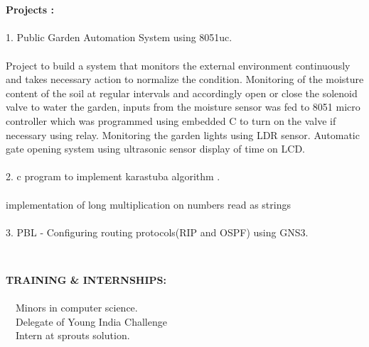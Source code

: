 \documentclass[1pt]{article}
\begin{document}
\begin{flushleft}
\begin{flushleft}
			\hspace{1cm}\\
			\hspace{1cm}\\
			
			\hspace{0.2cm}\textbf{Projects : } \\
			\ \\
			\hspace{.8cm} 1. Public Garden Automation System using 8051uc.\\
			\hspace{5.6cm}\\Project to build a system that monitors the external environment
			continuously and takes necessary action to normalize the condition.
			Monitoring of the moisture content of the soil at regular intervals
			and accordingly open or close the solenoid valve to water the
			garden, inputs from the moisture sensor was fed to 8051 micro
			controller which was programmed using embedded C to turn on the
			valve if necessary using relay.
			Monitoring the garden lights using LDR sensor.
			Automatic gate opening system using ultrasonic sensor display of
			time on LCD. \\
			\ \\
			\hspace{.8cm} 2. c program to implement karastuba algorithm .\\ \ \\
			implementation of long multiplication on numbers read as strings\\
			\ \\
			\hspace{.8cm} 3. PBL - Configuring routing protocols(RIP and OSPF) using GNS3.
			
			\hspace{1cm}\\ \hspace{1cm}
			
			{\small \textbf{TRAINING \& INTERNSHIPS:}}\\ \ \\
			\textbullet \ \ Minors in computer science.\\
			\textbullet \ \ Delegate of Young India Challenge \\	
			\textbullet \ \ Intern at sprouts solution.\\
			
			\hspace{1cm}\\ \hspace{1cm}
			

\end{flushleft}
\end{flushleft}
\end{document}

